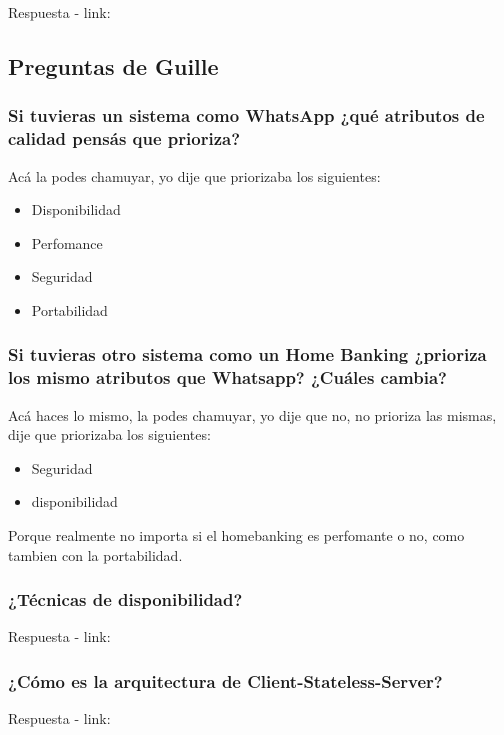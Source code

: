 \documentclass{article}
\begin{document}
    Respuesta - link: \textbf{~}
    
   \subsection{Preguntas de Guille}
   
   \subsubsection{Si tuvieras un sistema como WhatsApp ¿qué atributos de calidad pensás que prioriza?}
    Acá la podes chamuyar, yo dije que priorizaba los siguientes: 
    \begin{itemize}
        \item Disponibilidad
        \item Perfomance
        \item Seguridad
        \item Portabilidad
    \end{itemize}

  \subsubsection{Si tuvieras otro sistema como un Home Banking ¿prioriza los mismo atributos que Whatsapp? ¿Cuáles cambia?}
    Acá haces lo mismo, la podes chamuyar, yo dije que no, no prioriza las mismas, dije que priorizaba los siguientes: 
    \begin{itemize}
        \item Seguridad
        \item disponibilidad
    \end{itemize}

    Porque realmente no importa si el homebanking es perfomante o no, como tambien con la portabilidad. 


  \subsubsection{¿Técnicas de disponibilidad?}
    Respuesta - link: \textbf{~}

  \subsubsection{¿Cómo es la arquitectura de Client-Stateless-Server?}
    Respuesta - link: \textbf{~}
\end{document}
